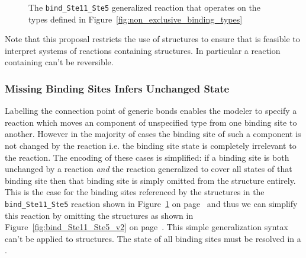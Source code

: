 \documentclass{cekarticle}
\begin{document}
\begin{figure}[h]
  \caption{The \texttt{bind\_Ste11\_Ste5} generalized reaction that operates on the types defined in
  Figure~\ref{fig:non_exclusive_binding_types}}
  \label{fig:bind_Ste11_Ste5}
\end{figure}

Note that this proposal restricts the use of 
structures to ensure that is feasible to interpret systems of
reactions containing  structures. In particular
a reaction containing  can't be reversible.

\subsubsection{Missing Binding Sites Infers Unchanged State}

Labelling the connection point of generic bonds enables the
modeler to specify a reaction which moves an component of
unspecified type from one binding site to another.  However in the
majority of cases the binding site of such a component is not
changed by the reaction i.e. the binding site state is completely
irrelevant to the reaction.  The encoding of these cases is
simplified:  if a binding site is both unchanged by a reaction
\emph{and} the reaction generalized to cover all states of that
binding site then that binding site is simply omitted from the
 structure entirely. This is the case for the
binding sites referenced by the  structures in
the \texttt{bind\_Ste11\_Ste5} reaction shown in
Figure~\ref{fig:bind_Ste11_Ste5} on
page~\pageref{fig:bind_Ste11_Ste5} and thus we can simplify this
reaction by omitting the  structures as shown
in Figure~\ref{fig:bind_Ste11_Ste5_v2} on
page~\pageref{fig:bind_Ste11_Ste5_v2}. This simple generalization
syntax can't be applied to  structures. The
state of all binding sites must be resolved in a
.
\end{document}
